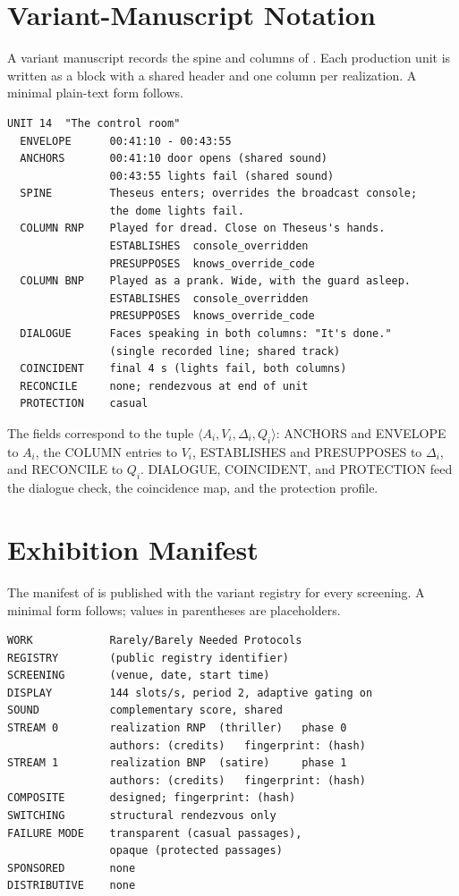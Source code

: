 \chapter{Variant-Manuscript Notation}\label{app:notation}

A variant manuscript records the spine and columns of . Each production unit is written as a block with a shared header and one column per realization. A minimal plain-text form follows.

\begin{verbatim}
UNIT 14  "The control room"
  ENVELOPE      00:41:10 - 00:43:55
  ANCHORS       00:41:10 door opens (shared sound)
                00:43:55 lights fail (shared sound)
  SPINE         Theseus enters; overrides the broadcast console;
                the dome lights fail.
  COLUMN RNP    Played for dread. Close on Theseus's hands.
                ESTABLISHES  console_overridden
                PRESUPPOSES  knows_override_code
  COLUMN BNP    Played as a prank. Wide, with the guard asleep.
                ESTABLISHES  console_overridden
                PRESUPPOSES  knows_override_code
  DIALOGUE      Faces speaking in both columns: "It's done."
                (single recorded line; shared track)
  COINCIDENT    final 4 s (lights fail, both columns)
  RECONCILE     none; rendezvous at end of unit
  PROTECTION    casual
\end{verbatim}

The fields correspond to the tuple $\langle A_i,V_i,\Delta_i,Q_i\rangle$: ANCHORS and ENVELOPE to $A_i$, the COLUMN entries to $V_i$, ESTABLISHES and PRESUPPOSES to $\Delta_i$, and RECONCILE to $Q_i$. DIALOGUE, COINCIDENT, and PROTECTION feed the dialogue check, the coincidence map, and the protection profile.

\chapter{Exhibition Manifest}\label{app:manifest}

The manifest of  is published with the variant registry for every screening. A minimal form follows; values in parentheses are placeholders.

\begin{verbatim}
WORK            Rarely/Barely Needed Protocols
REGISTRY        (public registry identifier)
SCREENING       (venue, date, start time)
DISPLAY         144 slots/s, period 2, adaptive gating on
SOUND           complementary score, shared
STREAM 0        realization RNP  (thriller)   phase 0
                authors: (credits)   fingerprint: (hash)
STREAM 1        realization BNP  (satire)     phase 1
                authors: (credits)   fingerprint: (hash)
COMPOSITE       designed; fingerprint: (hash)
SWITCHING       structural rendezvous only
FAILURE MODE    transparent (casual passages),
                opaque (protected passages)
SPONSORED       none
DISTRIBUTIVE    none
\end{verbatim}

